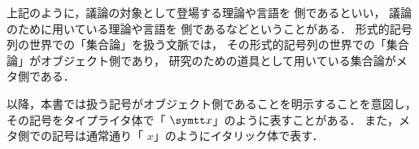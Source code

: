 上記のように，議論の対象として登場する理論や言語を%
%
側であるといい，
議論のために用いている理論や言語を%
%
側であるなどということがある．
形式的記号列の世界での「集合論」を扱う文脈では，
その形式的記号列の世界での「集合論」がオブジェクト側であり，
研究のための道具として用いている集合論がメタ側である．

以降，本書では扱う記号がオブジェクト側であることを明示することを意図し，
その記号をタイプライタ体で「%
%
\(\obj{x}\)」のように表すことがある．
また，メタ側での記号は通常通り「%
%
\(x\)」のようにイタリック体で表す．